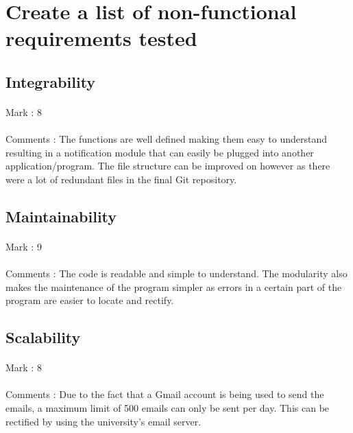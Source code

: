 \documentclass[11pt]{article}
\begin{document}
\section{Create a list of non-functional requirements tested}
\subsection{Integrability}
\paragraph{} Mark : 8
\paragraph{} Comments : The functions are well defined making them easy to understand resulting in a notification module that can easily be plugged into another application/program. The file structure can be improved on however as there were a lot of redundant files in the final Git repository.

\subsection{Maintainability}
\paragraph{} Mark : 9
\paragraph{} Comments : The code is readable and simple to understand. The modularity also makes the maintenance of the program simpler as errors in a certain part of the program are easier to locate and rectify. 

\subsection{Scalability}
\paragraph{} Mark : 8
\paragraph{} Comments : Due to the fact that a Gmail account is being used to send the emails, a maximum limit of 500 emails can only be sent per day. This can be rectified by using the university's email server.
\end{document}

